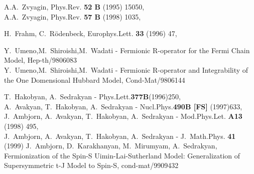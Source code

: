 \documentclass[a4paper,12pt]{article}
\begin{document}
\begin{thebibliography}{10}
 A.A.~Zvyagin, Phys.Rev. {\bf 52 B} (1995) 15050,\\
            A.A.~Zvyagin, Phys.Rev. {\bf 57 B} (1998) 1035,

 H.~Frahm, C.~R{\"o}denbeck, Europhys.Lett. {\bf
     33} (1996) 47,






 Y.~Umeno,M.~Shiroishi,M.~Wadati - Fermionic R-operator for the Fermi
               Chain Model, Hep-th/9806083\\
              Y.~Umeno,M.~Shiroishi,M.~Wadati - Fermionic R-operator and 
               Integrability of the One Domensional Hubbard Model,
               Cond-Mat/9806144

 T.~Hakobyan, A.~Sedrakyan  - Phys.Lett.{\bf 377B}(1996)250,\\
             A.~Avakyan, T.~Hakobyan, A.~Sedrakyan  - Nucl.Phys.{\bf 490B [FS]} 
              (1997)633, \\
              J.~Ambjorn, A.~Avakyan, T.~Hakobyan, A.~Sedrakyan - Mod.Phys.Let.
              {\bf A13 }(1998) 495,\\
              J.~Ambjorn, A.~Avakyan, T.~Hakobyan, A.~Sedrakyan - 
              J.~Math.Phys. {\bf 41} (1999)
 J.~Ambjorn, D.~Karakhanyan, M.~Mirumyam, A.~Sedrakyan, Fermionization
         of the Spin-S Uimin-Lai-Sutherland Model: Generalization of 
          Supersymmetric t-J Model to Spin-S, cond-mat/9909432


\end{thebibliography}
\end{document}
